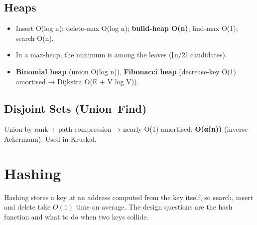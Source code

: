 \needspace{95pt}

\hypertarget{p2-07--36-heaps}{%
\subsection{Heaps}\label{p2-07--36-heaps}}



\begin{itemize}
\tightlist
\item
  Insert O(log n); delete-max O(log n); \textbf{build-heap O(n)}; find-max O(1); search O(n).
\item
  In a max-heap, the minimum is among the leaves (⌈n/2⌉ candidates).
\item
  \textbf{Binomial heap} (union O(log n)), \textbf{Fibonacci heap} (decrease-key O(1) amortised → Dijkstra O(E + V log V)).
\end{itemize}

\needspace{191pt}

\hypertarget{p2-07--37-disjoint-sets-unionfind}{%
\subsection{Disjoint Sets (Union--Find)}\label{p2-07--37-disjoint-sets-unionfind}}

Union by rank + path compression → nearly O(1) amortised: \textbf{O(α(n))} (inverse Ackermann). Used in Kruskal.

\needspace{125pt}

\hypertarget{p2-07--4-hashing}{%
\section{Hashing}\label{p2-07--4-hashing}}

Hashing stores a key at an address computed from the key itself, so search, insert and delete take \(O(1)\) time
on average. The design questions are the hash function and what to do when two keys collide.



\begingroup\small

